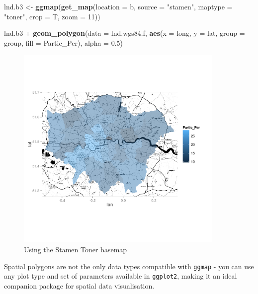 \documentclass[]{article}
\newenvironment{Shaded}{}{}
\newcommand{\KeywordTok}[1]{\textcolor[rgb]{0.00,0.44,0.13}{\textbf{{#1}}}}
\newcommand{\DataTypeTok}[1]{\textcolor[rgb]{0.56,0.13,0.00}{{#1}}}
\newcommand{\DecValTok}[1]{\textcolor[rgb]{0.25,0.63,0.44}{{#1}}}
\newcommand{\FloatTok}[1]{\textcolor[rgb]{0.25,0.63,0.44}{{#1}}}
\newcommand{\StringTok}[1]{\textcolor[rgb]{0.25,0.44,0.63}{{#1}}}
\newcommand{\NormalTok}[1]{{#1}}
\let\Oldincludegraphics\includegraphics
\renewcommand{\includegraphics}[1]{\Oldincludegraphics[width=10cm]{#1}}
\begin{document}
\begin{Shaded}
\begin{Highlighting}[]
\NormalTok{lnd.b3 <- }\KeywordTok{ggmap}\NormalTok{(}\KeywordTok{get_map}\NormalTok{(}\DataTypeTok{location =} \NormalTok{b, }\DataTypeTok{source =} \StringTok{"stamen"}\NormalTok{, }\DataTypeTok{maptype =} \StringTok{"toner"}\NormalTok{, }
    \DataTypeTok{crop =} \NormalTok{T, }\DataTypeTok{zoom =} \DecValTok{11}\NormalTok{))}

\NormalTok{lnd.b3 + }\KeywordTok{geom_polygon}\NormalTok{(}\DataTypeTok{data =} \NormalTok{lnd.wgs84.f, }\KeywordTok{aes}\NormalTok{(}\DataTypeTok{x =} \NormalTok{long, }\DataTypeTok{y =} \NormalTok{lat, }\DataTypeTok{group =} \NormalTok{group, }
    \DataTypeTok{fill =} \NormalTok{Partic_Per), }\DataTypeTok{alpha =} \FloatTok{0.5}\NormalTok{)}
\end{Highlighting}
\end{Shaded}
\begin{figure}[htbp]
\centering
\includegraphics{figure/Using_the_Stamen_Toner_basemap.png}
\caption{Using the Stamen Toner basemap}
\end{figure}

Spatial polygons are not the only data types compatible with
\texttt{ggmap} - you can use any plot type and set of parameters
available in \texttt{ggplot2}, making it an ideal companion package for
spatial data visualisation.
\end{document}
